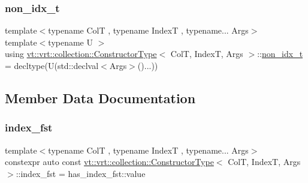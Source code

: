 \subsubsection{\texorpdfstring{non\+\_\+idx\+\_\+t}{non\_idx\_t}}
{\footnotesize\ttfamily template$<$typename ColT , typename IndexT , typename... Args$>$ \\
template$<$typename U $>$ \\
using \hyperlink{structvt_1_1vrt_1_1collection_1_1_constructor_type}{vt\+::vrt\+::collection\+::\+Constructor\+Type}$<$ ColT, IndexT, Args $>$\+::\hyperlink{structvt_1_1vrt_1_1collection_1_1_constructor_type_a25485f9d6d78bd2e7d43f41562411d6a}{non\+\_\+idx\+\_\+t} =  decltype(U(std\+::declval$<$Args$>$()...))}



\subsection{Member Data Documentation}
\mbox{\label{structvt_1_1vrt_1_1collection_1_1_constructor_type_a7ce20228ab2e310eb2e5217652af1741}} 
\subsubsection{\texorpdfstring{index\+\_\+fst}{index\_fst}}
{\footnotesize\ttfamily template$<$typename ColT , typename IndexT , typename... Args$>$ \\
constexpr auto const \hyperlink{structvt_1_1vrt_1_1collection_1_1_constructor_type}{vt\+::vrt\+::collection\+::\+Constructor\+Type}$<$ ColT, IndexT, Args $>$\+::index\+\_\+fst = has\+\_\+index\+\_\+fst\+::value\hspace{0.3cm}{\ttfamily [static]}}

\mbox{\label{structvt_1_1vrt_1_1collection_1_1_constructor_type_a8dc80a798ad30e23016abddd56077be5}} 
